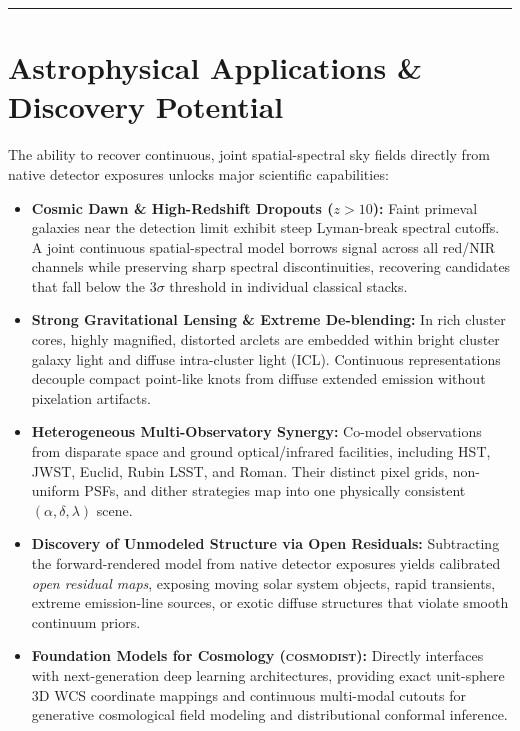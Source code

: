 \documentclass[11pt,a4paper]{article}
\begin{document}
\vspace{1em}
\hrule
\vspace{1em}

\section{Astrophysical Applications \& Discovery Potential}

The ability to recover continuous, joint spatial-spectral sky fields directly from native detector exposures unlocks major scientific capabilities:

\begin{itemize}
    \item \textbf{Cosmic Dawn \& High-Redshift Dropouts ($z > 10$):} Faint primeval galaxies near the detection limit exhibit steep Lyman-break spectral cutoffs. A joint continuous spatial-spectral model borrows signal across all red/NIR channels while preserving sharp spectral discontinuities, recovering candidates that fall below the $3\sigma$ threshold in individual classical stacks.
    \item \textbf{Strong Gravitational Lensing \& Extreme De-blending:} In rich cluster cores, highly magnified, distorted arclets are embedded within bright cluster galaxy light and diffuse intra-cluster light (ICL). Continuous representations decouple compact point-like knots from diffuse extended emission without pixelation artifacts.
    \item \textbf{Heterogeneous Multi-Observatory Synergy:}
    Co-model observations from disparate space and ground optical/infrared
    facilities, including HST, JWST, Euclid, Rubin LSST, and Roman.  Their
    distinct pixel grids, non-uniform PSFs, and dither strategies map into one
    physically consistent $(\alpha, \delta, \lambda)$ scene.
    \item \textbf{Discovery of Unmodeled Structure via Open Residuals:} Subtracting the forward-rendered model from native detector exposures yields calibrated \emph{open residual maps}, exposing moving solar system objects, rapid transients, extreme emission-line sources, or exotic diffuse structures that violate smooth continuum priors.
    \item \textbf{Foundation Models for Cosmology (\textsc{cosmodist}):} Directly interfaces with next-generation deep learning architectures, providing exact unit-sphere 3D WCS coordinate mappings and continuous multi-modal cutouts for generative cosmological field modeling and distributional conformal inference.
\end{itemize}
\end{document}
